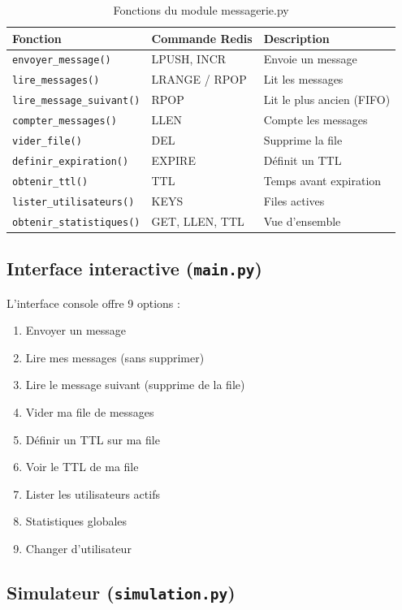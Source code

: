 \documentclass[12pt,a4paper]{article}
\begin{document}
\begin{table}[H]
\centering
\begin{tabular}{|l|l|l|}
\hline
\textbf{Fonction} & \textbf{Commande Redis} & \textbf{Description} \\
\hline
\texttt{envoyer\_message()} & LPUSH, INCR & Envoie un message \\
\texttt{lire\_messages()} & LRANGE / RPOP & Lit les messages \\
\texttt{lire\_message\_suivant()} & RPOP & Lit le plus ancien (FIFO) \\
\texttt{compter\_messages()} & LLEN & Compte les messages \\
\texttt{vider\_file()} & DEL & Supprime la file \\
\texttt{definir\_expiration()} & EXPIRE & D\'efinit un TTL \\
\texttt{obtenir\_ttl()} & TTL & Temps avant expiration \\
\texttt{lister\_utilisateurs()} & KEYS & Files actives \\
\texttt{obtenir\_statistiques()} & GET, LLEN, TTL & Vue d'ensemble \\
\hline
\end{tabular}
\caption{Fonctions du module messagerie.py}
\end{table}

\subsection{Interface interactive (\texttt{main.py})}

L'interface console offre 9 options :
\begin{enumerate}
    \item Envoyer un message
    \item Lire mes messages (sans supprimer)
    \item Lire le message suivant (supprime de la file)
    \item Vider ma file de messages
    \item D\'efinir un TTL sur ma file
    \item Voir le TTL de ma file
    \item Lister les utilisateurs actifs
    \item Statistiques globales
    \item Changer d'utilisateur
\end{enumerate}

\subsection{Simulateur (\texttt{simulation.py})}
\end{document}
